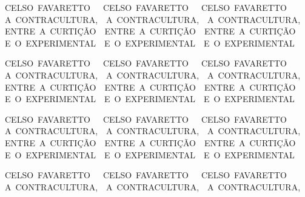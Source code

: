{{\noindent\mbox{\noindent\hspace*{-180pt}CELSO FAVARETTO \mbox{  }\mbox{  }CELSO FAVARETTO \mbox{  }\mbox{  }CELSO FAVARETTO\\}
\mbox{\hspace*{-180pt}A CONTRACULTURA, \mbox{  }A CONTRACULTURA, \mbox{  }A CONTRACULTURA,\\}
\mbox{\hspace*{-180pt}ENTRE A CURTIÇÃO \mbox{  }ENTRE A CURTIÇÃO \mbox{  }ENTRE A CURTIÇÃO\\}
\mbox{\hspace*{-180pt}E O EXPERIMENTAL \mbox{  }E O EXPERIMENTAL \mbox{  }E O EXPERIMENTAL}

\noindent\mbox{\noindent\hspace*{-38pt}CELSO FAVARETTO \mbox{  }\mbox{  }CELSO FAVARETTO \mbox{  }\mbox{  }CELSO FAVARETTO\\}
\mbox{\hspace*{-38pt}A CONTRACULTURA, \mbox{  }A CONTRACULTURA, \mbox{  }A CONTRACULTURA,\\}
\mbox{\hspace*{-38pt}ENTRE A CURTIÇÃO \mbox{  }ENTRE A CURTIÇÃO \mbox{  }ENTRE A CURTIÇÃO\\}
\mbox{\hspace*{-38pt}E O EXPERIMENTAL \mbox{  }E O EXPERIMENTAL \mbox{  }E O EXPERIMENTAL}

\noindent\mbox{\noindent\hspace*{-140pt}CELSO FAVARETTO \mbox{  }\mbox{  }CELSO FAVARETTO \mbox{  }\mbox{  }CELSO FAVARETTO\\} \enlargethispage{\textheight}
\mbox{\hspace*{-140pt}A CONTRACULTURA, \mbox{  }A CONTRACULTURA, \mbox{  }A CONTRACULTURA,\\}
\mbox{\hspace*{-140pt}ENTRE A CURTIÇÃO \mbox{  }ENTRE A CURTIÇÃO \mbox{  }ENTRE A CURTIÇÃO\\}
\mbox{\hspace*{-140pt}E O EXPERIMENTAL \mbox{  }E O EXPERIMENTAL \mbox{  }E O EXPERIMENTAL}

\noindent\mbox{\noindent\hspace*{-160pt}CELSO FAVARETTO \mbox{  }\mbox{  }CELSO FAVARETTO \mbox{  }\mbox{  }CELSO FAVARETTO\\} 
\mbox{\hspace*{-160pt}A CONTRACULTURA, \mbox{  }A CONTRACULTURA, \mbox{  }A CONTRACULTURA,}
}}




